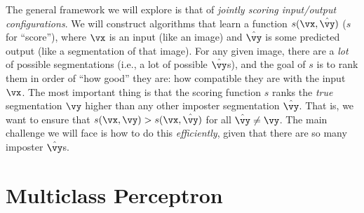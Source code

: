 The general framework we will explore is that of \emph{jointly scoring input/output configurations}. We will construct algorithms that learn a function $s(\vx,\hat\vy)$ ($s$ for ``score''), where $\vx$ is an input (like an image) and $\hat\vy$ is some predicted output (like a segmentation of that image).
For any given image, there are a \emph{lot} of possible segmentations (i.e., a lot of possible $\hat\vy$s), and the goal of $s$ is to rank them in order of ``how good'' they are: how compatible they are with the input $\vx$.
The most important thing is that the scoring function $s$ ranks the \emph{true} segmentation $\vy$ higher than any other imposter segmentation $\hat\vy$.
That is, we want to ensure that $s(\vx,\vy) > s(\vx,\hat\vy)$ for all $\hat\vy \neq \vy$.
The main challenge we will face is how to do this \emph{efficiently}, given that there are so many imposter $\hat\vy$s.

\section{Multiclass Perceptron}



